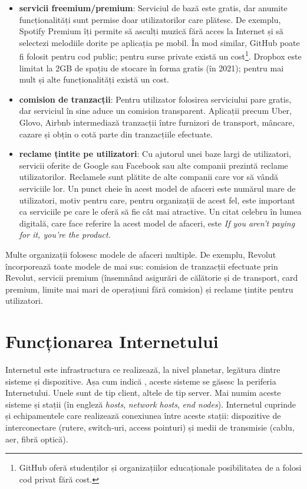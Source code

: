 \begin{itemize}
  \item \textbf{servicii freemium/premium}:
    Serviciul de bază este gratis, dar anumite funcționalități sunt permise doar utilizatorilor care plătesc.
    De exemplu, Spotify Premium îți permite să asculți muzică fără acces la Internet și să selectezi melodiile dorite pe aplicația pe mobil.
    În mod similar, GitHub poate fi folosit pentru cod public; pentru surse private există un cost\footnote{GitHub oferă studenților și organizațiilor educaționale posibilitatea de a folosi cod privat fără cost.}.
    Dropbox este limitat la 2GB de spațiu de stocare în forma gratis (în 2021); pentru mai mult și alte funcționalități există un cost.
  \item \textbf{comision de tranzacții}:
    Pentru utilizator folosirea serviciului pare gratis, dar serviciul în sine aduce un comision transparent.
    Aplicații precum Uber, Glovo, Airbnb intermediază tranzacții între furnizori de transport, mâncare, cazare și obțin o cotă parte din tranzacțiile efectuate.
  \item \textbf{reclame țintite pe utilizatori}:
    Cu ajutorul unei baze largi de utilizatori, servicii oferite de Google sau Facebook sau alte companii prezintă reclame utilizatorilor.
    Reclamele sunt plătite de alte companii care vor să vândă serviciile lor.
    Un punct cheie în acest model de afaceri este numărul mare de utilizatori, motiv pentru care, pentru organizații de acest fel, este important ca serviciile pe care le oferă să fie cât mai atractive.
    Un citat celebru în lumea digitală, care face referire la acest model de afaceri, este \textit{If you aren't paying for it, you're the product.}
\end{itemize}

Multe organizații folosesc modele de afaceri multiple.
De exemplu, Revolut încorporează toate modele de mai sus: comision de tranzacții efectuate prin Revolut, servicii premium (însemnând asigurări de călătorie și de transport, card premium, limite mai mari de operațiuni fără comision) și reclame țintite pentru utilizatori.

\section{Funcționarea Internetului}
\label{sec:net:internet}

Internetul este infrastructura ce realizează, la nivel planetar, legătura dintre sisteme și dispozitive.
Așa cum indică , aceste sisteme se găsesc la periferia Internetului.
Unele sunt de tip client, altele de tip server.
Mai numim aceste sisteme și stații (în engleză \textit{hosts}, \textit{network hosts}, \textit{end nodes}).
Internetul cuprinde și echipamentele care realizează conexiunea între aceste stații: dispozitive de interconectare (rutere, switch-uri, access pointuri) și medii de transmisie (cablu, aer, fibră optică).

